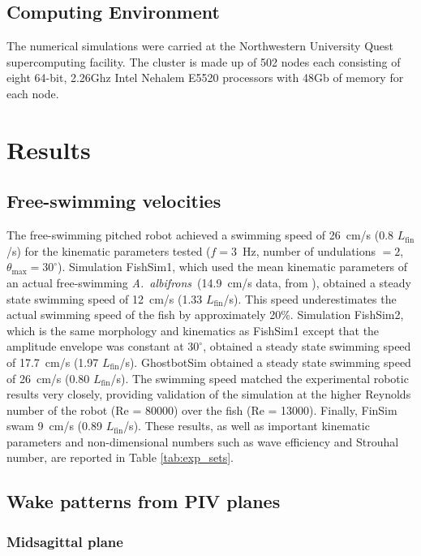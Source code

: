 \documentclass[onecolumn]{IEEEtran}
\newcommand{\albif}{{\it A.~albifrons}}
\begin{document}
\subsection{Computing Environment}
The numerical simulations were carried at the Northwestern University Quest supercomputing facility. The cluster is made up of 502 nodes 
each consisting of eight 64-bit, 2.26Ghz Intel Nehalem E5520 processors with 48Gb of memory for each node. 


\section{Results}

\subsection{Free-swimming velocities}

The free-swimming pitched robot achieved a swimming speed of
26~cm/s (0.8 $L_\text{fin}$/s) for the kinematic parameters
tested ($f = 3$~Hz, number of undulations $=2$, $\theta_\text{max} = 30^\circ$). 
Simulation FishSim1, which used the mean kinematic parameters of an actual
free-swimming \albif ~(14.9~cm/s data, from \citet*{Ruiz13a}), obtained a steady state swimming speed of
12~cm/s (1.33 $L_\text{fin}$/s). This speed underestimates the actual
swimming speed of the fish by approximately 20\%. Simulation
FishSim2, which is the same morphology and kinematics as FishSim1
except that the amplitude envelope was constant at $30^\circ$,
obtained a steady state swimming speed of 17.7~cm/s (1.97
$L_\text{fin}$/s).  GhostbotSim obtained a
steady state swimming speed of 26~cm/s (0.80 $L_\text{fin}$/s).
The swimming speed matched 
the experimental robotic results very closely, providing validation of the 
simulation at the higher Reynolds number of the robot (Re = 80000) over the fish (Re = 13000).  
Finally, FinSim swam 9~cm/s (0.89 $L_\text{fin}$/s).
These results, as well as important kinematic parameters and
non-dimensional numbers such as wave efficiency and Strouhal
number, are reported in Table \ref{tab:exp_sets}.

\subsection{Wake patterns from PIV planes}

\subsubsection{Midsagittal plane}
\end{document}
